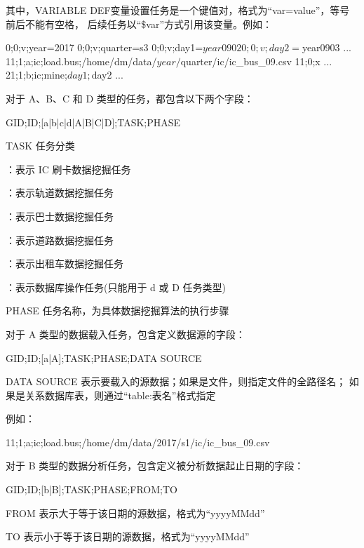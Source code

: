 其中，VARIABLE DEF变量设置任务是一个键值对，格式为“var=value”，等号前后不能有空格，
后续任务以“\${var}”方式引用该变量。例如：

\begin{examplecode}
0;0;v;year=2017
0;0;v;quarter=s3
0;0;v;day1=${year}0902
0;0;v;day2=${year}0903
...
11;1;a;ic;load.bus;/home/dm/data/${year}/${quarter}/ic/ic_bus_09.csv
11;0;x
...
21;1;b;ic;mine;${day1};${day2}
...
\end{examplecode}

对于 A、B、C 和 D 类型的任务，都包含以下两个字段：
\begin{scriptcode}
GID;ID;[a|b|c|d|A|B|C|D];TASK;PHASE
\end{scriptcode}

\begin{para}
\item [TASK] 任务分类
\begin{cit}
\item {}：表示 IC 刷卡数据挖掘任务
\item {}：表示轨道数据挖掘任务
\item {}：表示巴士数据挖掘任务
\item {}：表示道路数据挖掘任务
\item {}：表示出租车数据挖掘任务
\item {}：表示数据库操作任务(只能用于 d 或 D 任务类型)
\end{cit}
\item [PHASE] 任务名称，为具体数据挖掘算法的执行步骤
\end{para}

对于 A 类型的数据载入任务，包含定义数据源的字段：
\begin{scriptcode}
GID;ID;[a|A];TASK;PHASE;DATA SOURCE
\end{scriptcode}
\begin{para}
\item[DATA SOURCE] 表示要载入的源数据；如果是文件，则指定文件的全路径名；
如果是关系数据库表，则通过“table:表名”格式指定
\end{para}

例如：
\begin{examplecode}
11;1;a;ic;load.bus;/home/dm/data/2017/s1/ic/ic_bus_09.csv
\end{examplecode}

对于 B 类型的数据分析任务，包含定义被分析数据起止日期的字段：
\begin{scriptcode}
GID;ID;[b|B];TASK;PHASE;FROM;TO
\end{scriptcode}
\begin{para}
\item[FROM] 表示大于等于该日期的源数据，格式为“yyyyMMdd” 
\item[TO] 表示小于等于该日期的源数据，格式为“yyyyMMdd”
\end{para}

